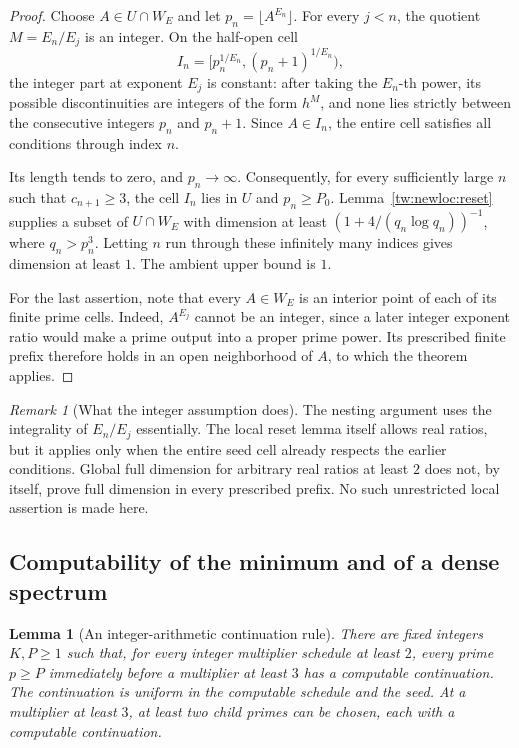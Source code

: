 \documentclass[11pt,a4paper]{article}
\newtheorem{lemma}[theorem]{Lemma}
\theoremstyle{definition}
\theoremstyle{remark}
\newtheorem{remark}[theorem]{Remark}
\numberwithin{equation}{section}
\begin{document}
\begin{proof}
Choose $A\in U\cap W_E$ and let $p_n=\lfloor A^{E_n}\rfloor$.
For every $j<n$, the quotient $M=E_n/E_j$ is an integer. On the half-open
cell
\[
 I_n=[p_n^{1/E_n},(p_n+1)^{1/E_n}),
\]
the integer part at exponent $E_j$ is constant: after taking the
$E_n$-th power, its possible discontinuities are integers of the form
$h^M$, and none lies strictly between the consecutive integers
$p_n$ and $p_n+1$. Since $A\in I_n$, the entire cell satisfies all
conditions through index $n$.

Its length tends to zero, and $p_n\to\infty$. Consequently, for every
sufficiently large $n$ such that $c_{n+1}\ge3$, the cell $I_n$ lies in
$U$ and $p_n\ge P_0$. Lemma~\ref{tw:newloc:reset} supplies a subset of
$U\cap W_E$ with dimension at least
$(1+4/(q_n\log q_n))^{-1}$, where $q_n>p_n^3$. Letting $n$ run through
these infinitely many indices gives dimension at least $1$. The ambient
upper bound is $1$.

For the last assertion, note that every $A\in W_E$ is an interior point
of each of its finite prime cells. Indeed, $A^{E_j}$ cannot be an integer,
since a later integer exponent ratio would make a prime output into a
proper prime power. Its prescribed finite prefix therefore holds in an
open neighborhood of $A$, to which the theorem applies.
\end{proof}

\begin{remark}[What the integer assumption does]
The nesting argument uses the integrality of $E_n/E_j$ essentially.
The local reset lemma itself allows real ratios, but it applies only
when the entire seed cell already respects the earlier conditions.
Global full dimension for arbitrary real ratios at least $2$ does not,
by itself, prove full dimension in every prescribed prefix. No such
unrestricted local assertion is made here.
\end{remark}

\subsection{Computability of the minimum and of a dense spectrum}

\begin{lemma}[An integer-arithmetic continuation rule]
\label{tw:newloc:computablebranch}
There are fixed integers $K,P\ge1$ such that, for every integer multiplier
schedule at least $2$, every prime $p\ge P$ immediately before a
multiplier at least $3$ has a computable continuation. The continuation
is uniform in the computable schedule and the seed. At a multiplier at
least $3$, at least two child primes can be chosen, each with a
computable continuation.
\end{lemma}
\end{document}
